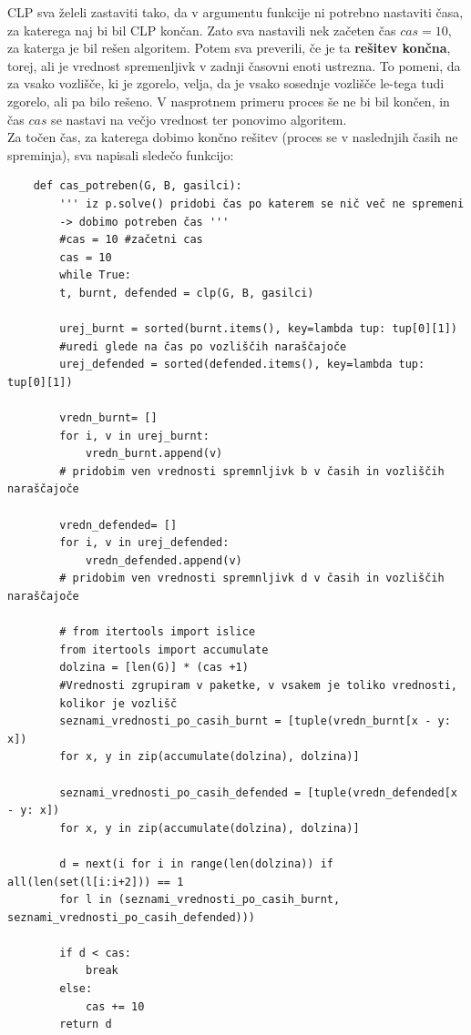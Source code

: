 \documentclass[a4paper, 12pt]{article}
\begin{document}
\noindent CLP sva želeli zastaviti tako, da v argumentu funkcije ni potrebno nastaviti časa,
za katerega naj bi bil CLP končan. Zato sva nastavili nek začeten čas $cas = 10,$ za katerga 
je bil rešen algoritem. Potem sva preverili, če je ta \textbf{rešitev končna}, 
torej, ali je vrednost spremenljivk v zadnji časovni enoti ustrezna.
To pomeni, da za vsako vozlišče, ki je zgorelo, velja, da je vsako sosednje
vozlišče le-tega tudi zgorelo, ali pa bilo rešeno. V nasprotnem primeru 
proces še ne bi bil končen, in čas $cas$ se nastavi na večjo vrednost ter
ponovimo algoritem. \\

\noindent Za točen čas, za katerega dobimo končno rešitev (proces se v naslednjih časih ne spreminja),
sva napisali sledečo funkcijo:

\begin{scriptsize}
\begin{verbatim}
    def cas_potreben(G, B, gasilci):
        ''' iz p.solve() pridobi čas po katerem se nič več ne spremeni 
        -> dobimo potreben čas '''
        #cas = 10 #začetni cas
        cas = 10
        while True:
        t, burnt, defended = clp(G, B, gasilci)

        urej_burnt = sorted(burnt.items(), key=lambda tup: tup[0][1])
        #uredi glede na čas po vozliščih naraščajoče
        urej_defended = sorted(defended.items(), key=lambda tup: tup[0][1]) 

        vredn_burnt= []
        for i, v in urej_burnt:
            vredn_burnt.append(v)
        # pridobim ven vrednosti spremnljivk b v časih in vozliščih naraščajoče

        vredn_defended= []
        for i, v in urej_defended:
            vredn_defended.append(v)
        # pridobim ven vrednosti spremnljivk d v časih in vozliščih naraščajoče

        # from itertools import islice
        from itertools import accumulate
        dolzina = [len(G)] * (cas +1) 
        #Vrednosti zgrupiram v paketke, v vsakem je toliko vrednosti, 
        kolikor je vozlišč
        seznami_vrednosti_po_casih_burnt = [tuple(vredn_burnt[x - y: x]) 
        for x, y in zip(accumulate(dolzina), dolzina)]

        seznami_vrednosti_po_casih_defended = [tuple(vredn_defended[x - y: x]) 
        for x, y in zip(accumulate(dolzina), dolzina)]

        d = next(i for i in range(len(dolzina)) if all(len(set(l[i:i+2])) == 1 
        for l in (seznami_vrednosti_po_casih_burnt, seznami_vrednosti_po_casih_defended)))
            
        if d < cas:
            break
        else:
            cas += 10
        return d
\end{verbatim}
\end{scriptsize}
\end{document}
